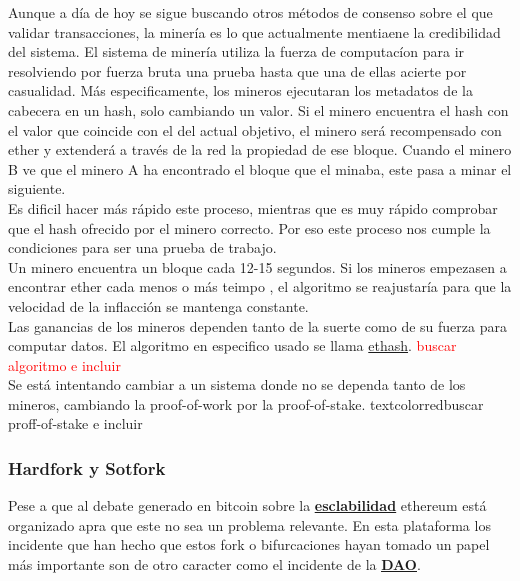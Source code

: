 \documentclass[11pt,a4paper]{article}
\begin{document}
Aunque a día de hoy se sigue buscando otros métodos de consenso sobre el que validar transacciones, la minería es lo que actualmente mentiaene la credibilidad del sistema. El sistema de minería utiliza la fuerza de computacíon para ir resolviendo por fuerza bruta una prueba hasta que una de ellas acierte por casualidad. Más especificamente, los mineros ejecutaran los metadatos de la cabecera en un hash, solo cambiando un valor. Si el minero encuentra el hash con el valor que coincide con el del actual objetivo, el minero será recompensado con ether y extenderá a través de la red la propiedad de ese bloque. Cuando el minero B ve que el minero A ha encontrado el bloque que el minaba, este pasa a minar el siguiente.\\

Es dificil hacer más rápido este proceso, mientras que es muy rápido comprobar que el hash ofrecido por el minero correcto. Por eso este proceso nos cumple la condiciones para ser una prueba de trabajo.\\

Un minero encuentra un bloque cada 12-15 segundos. Si los mineros empezasen a encontrar ether cada menos o más teimpo , el algoritmo se reajustaría para que la velocidad de la inflacción se mantenga constante.\\

Las ganancias de los mineros dependen tanto de la suerte como de su fuerza para computar datos. El algoritmo en especifico usado se llama \underline{ethash}. \textcolor{red}{buscar algoritmo e incluir}\\

Se está intentando cambiar a un sistema donde no se dependa tanto de los mineros, cambiando la proof-of-work por la proof-of-stake.
textcolor{red}{buscar proff-of-stake e incluir}\\

\subsubsection{Hardfork y Sotfork}
Pese a que al debate generado en bitcoin sobre la \hyperref[sec:escalabilidad]{\textbf{\underline{esclabilidad}}} ethereum está organizado apra que este no sea un problema relevante. En esta plataforma los incidente que han hecho que estos fork o bifurcaciones hayan tomado un papel más importante son de otro caracter como el incidente de la \hyperref[sec:dao]{\textbf{\underline{DAO}}}.\\
\end{document}
